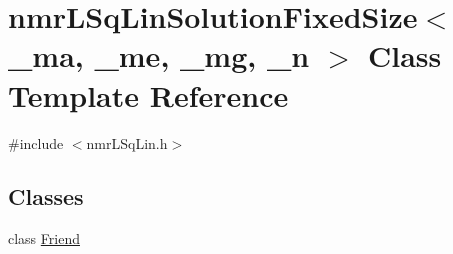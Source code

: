 \hypertarget{classnmr_l_sq_lin_solution_fixed_size}{}\section{nmr\+L\+Sq\+Lin\+Solution\+Fixed\+Size$<$ \+\_\+ma, \+\_\+me, \+\_\+mg, \+\_\+n $>$ Class Template Reference}
\label{classnmr_l_sq_lin_solution_fixed_size}


{\ttfamily \#include $<$nmr\+L\+Sq\+Lin.\+h$>$}

\subsection*{Classes}
\begin{DoxyCompactItemize}
\item 
class \hyperlink{classnmr_l_sq_lin_solution_fixed_size_1_1_friend}{Friend}
\end{DoxyCompactItemize}
